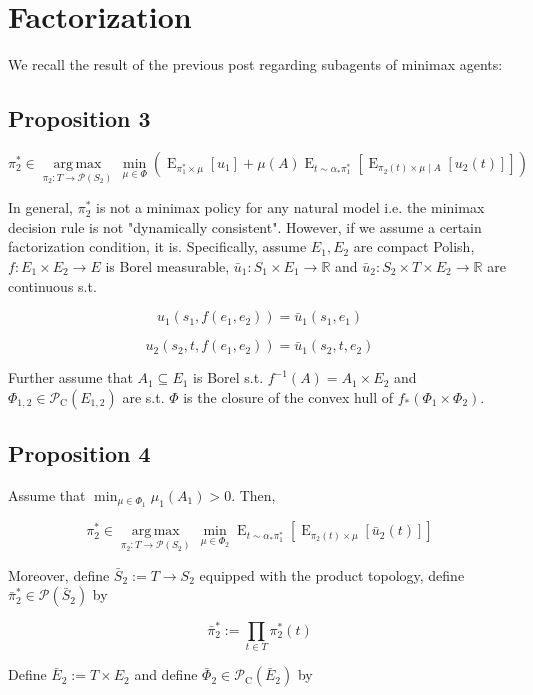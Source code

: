 \documentclass[a4paper]{article}
\DeclareMathOperator{\E}{E}
\newcommand{\Argmax}[1]{\underset{#1}{\operatorname{arg\,max}}\,}
\newcommand{\Reals}{\mathbb{R}}
\newcommand{\Prob}{\mathcal{P}}
\newcommand{\CC}{\mathcal{P}_{\operatorname{C}}}
\begin{document}
\section{Factorization}

We recall the result of the previous post regarding subagents of minimax agents:

\subsection{Proposition 3}

$$\pi_2^* \in \Argmax{\pi_2: T \rightarrow \Prob(S_2)} \min_{\mu \in \Phi} (\E_{\pi_1^* \times \mu}[u_1] + \mu(A) \E_{t \sim \alpha_*\pi_1^*}[\E_{\pi_2(t) \times \mu \mid A}[u_2(t)]])$$

In general, ${\pi_2^*}$ is not a minimax policy for any natural model i.e. the minimax decision rule is not "dynamically consistent". However, if we assume a certain factorization condition, it is. Specifically, assume ${E_1, E_2}$ are compact Polish, ${f: E_1 \times E_2 \rightarrow E}$ is Borel measurable, ${\bar{u}_1: S_1 \times E_1 \rightarrow \Reals}$ and ${\bar{u}_2: S_2 \times T \times E_2 \rightarrow \Reals}$ are continuous s.t. 

$${u_1(s_1,f(e_1,e_2))=\bar{u}_1(s_1,e_1)}$$

$${u_2(s_2,t,f(e_1,e_2))=\bar{u}_1(s_2,t,e_2)}$$

Further assume that ${A_1 \subseteq E_1}$ is Borel s.t. ${f^{-1}(A) = A_1 \times E_2}$ and ${\Phi_{1,2} \in \CC(E_{1,2})}$ are s.t. ${\Phi}$ is the closure of the convex hull of ${f_*(\Phi_1 \times \Phi_2)}$.

\subsection{Proposition 4}

Assume that ${\min_{\mu \in \Phi_1} \mu_1(A_1) > 0}$. Then,

$$\pi_2^* \in \Argmax{\pi_2: T \rightarrow \Prob(S_2)} \min_{\mu \in \Phi_2} \E_{t \sim \alpha_*\pi_1^*}[\E_{\pi_2(t) \times \mu}[\bar{u}_2(t)]]$$

Moreover, define ${\bar{S}_2:=T \rightarrow S_2}$ equipped with the product topology, define ${\bar{\pi}_2^* \in \Prob(\bar{S}_2)}$ by

$${\bar{\pi}_2^* := \prod_{t \in T} \pi_2^*(t)}$$

Define ${\bar{E}_2:=T \times E_2}$ and define ${\bar{\Phi}_2 \in \CC(\bar{E}_2)}$ by
\end{document}
